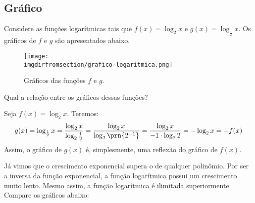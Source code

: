 \subsection{Gráfico}

\begin{example}
    Considere as funções logarítmicas tais que $f(x) = \log_2 x$ e $g(x) = \log_{\frac 1 2} x$. Os gráficos de $f$ e $g$ são apresentados abaixo.
    \begin{figure}[H]
        \centering
        \texttt{[image: \\imgdirfromsection/grafico-logaritmica.png]}
        \caption{Gráficos das funções $f$ e $g$.}
        \label{img:grafico-logaritmica}
    \end{figure}
\end{example}

Qual a relação entre os gráficos dessas funções?

\begin{solution}
    Seja $f(x) = \log_2 x$. Teremos:
    \[
        g(x) = \log_{\frac 1 2}{x}
        = \frac{\log_2 x}{\log_2 {\frac 1 2}}
        = \frac{\log_2 x}{\log_2 \prn{2^{-1}}}
        = \frac{\log_2 x}{-1\cdot\log_2 2}
        = -\log_2 x
        = -f(x)
    \]
    Assim, o gráfico de $g(x)$ é, simplesmente, uma reflexão do gráfico de $f(x)$.
\end{solution}

\begin{remark}
    Já vimos que o crescimento exponencial supera o de qualquer polinômio. Por ser a inversa da função exponencial, a função logarítmica possui um crescimento muito lento. Mesmo assim, a função logarítmica é ilimitada superiormente. Compare os gráficos abaixo:
\end{remark}

\begin{onlineact}
\end{onlineact}